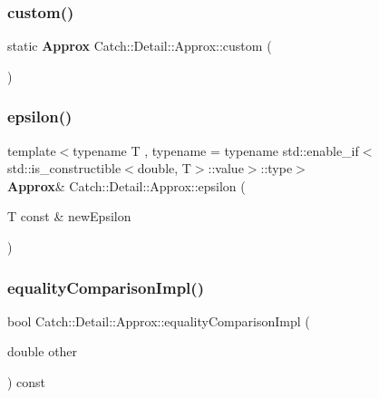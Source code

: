 \subsubsection{custom()}
{\footnotesize\ttfamily static \textbf{ Approx} Catch\+::\+Detail\+::\+Approx\+::custom (\begin{DoxyParamCaption}{ }\end{DoxyParamCaption})\hspace{0.3cm}{\ttfamily [static]}}

\mbox{\label{class_catch_1_1_detail_1_1_approx_acd26adba86a066b9f40dad467f23bc85}} 
\subsubsection{epsilon()}
{\footnotesize\ttfamily template$<$typename T , typename  = typename std\+::enable\+\_\+if$<$std\+::is\+\_\+constructible$<$double, T$>$\+::value$>$\+::type$>$ \\
\textbf{ Approx}\& Catch\+::\+Detail\+::\+Approx\+::epsilon (\begin{DoxyParamCaption}\item[{T const \&}]{new\+Epsilon }\end{DoxyParamCaption})\hspace{0.3cm}{\ttfamily [inline]}}

\mbox{\label{class_catch_1_1_detail_1_1_approx_af53c48227a7b654da58adeb1d360b715}} 
\subsubsection{equalityComparisonImpl()}
{\footnotesize\ttfamily bool Catch\+::\+Detail\+::\+Approx\+::equality\+Comparison\+Impl (\begin{DoxyParamCaption}\item[{double}]{other }\end{DoxyParamCaption}) const\hspace{0.3cm}{\ttfamily [private]}}

\mbox{\label{class_catch_1_1_detail_1_1_approx_a6467dc18791e1a1f4c15c4fb63cf5051}} 
